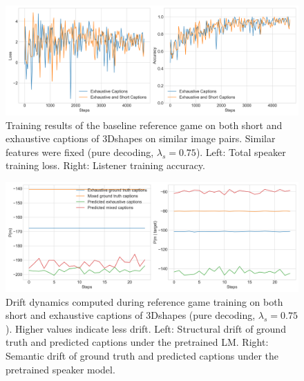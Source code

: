 \begin{figure}[h]
	\centering
	\includegraphics[width=\linewidth]{images/3dshapes_similarFixed_short_vs_exh_075_losses.png}
	\caption{Training results of the baseline reference game on both short and exhaustive captions of 3Dshapes on similar image pairs. Similar features were fixed (pure decoding, $\lambda_s=0.75$). Left: Total speaker training loss. Right: Listener training accuracy.}
	\label{fig:3dshapes_wShort_similarFixed_075_speaker_losses_listener_acc}
\end{figure}

\begin{figure}[h]
	\centering
	\includegraphics[width=\linewidth]{images/3dshapes_exh_short_structural_semantic_drift_49_pure_075_similarFixed.png}
	\caption{Drift dynamics computed during reference game training on both short and exhaustive captions of 3Dshapes (pure decoding, $\lambda_s=0.75$). Higher values indicate less drift. Left: Structural drift of ground truth and predicted captions under the pretrained LM. Right: Semantic drift of ground truth and predicted captions under the pretrained speaker model.}
	\label{fig:3dshapes_wShort_similarFixed_075_str_sem_drift}
\end{figure}

